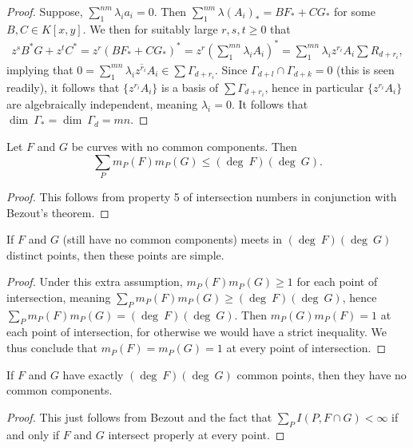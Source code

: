 \begin{proof}
        Suppose, $\sum_1^{nm} \lambda_i a_i = 0$. Then $\sum_1^{nm} \lambda (A_i)_\ast = BF_\ast+CG_\ast$ for some $B,C\in K[x,y]$. We then for suitably large $r,s,t\geq0$ that
        \begin{align*}
            z^sB^\ast G + z^tC^\ast = z^r(BF_\ast + CG_\ast)^\ast =z^r\left(\sum_1^{mn} \lambda_iA_i\right)^\ast = \sum_1^{mn}\lambda_iz^{r_i}A_i\sum R_{d+r_i},
        \end{align*}
        implying that $0=\sum_1^{mn} \overline{\lambda_iz^{r_i}A_i}\in \sum \Gamma_{d+r_i}.$ Since $\Gamma_{d+l} \cap \Gamma_{d+k} =0$ (this is seen readily), it follows that $\{z^{r_i}A_i\}$ is a basis of $\sum \Gamma_{d+r_i}$, hence in particular $\{z^{r_i}A_i\}$ are algebraically independent, meaning $\lambda_i=0$. It follows that $\dim\ \Gamma_\ast = \dim \ \Gamma_d = mn.$
    \end{proof}
    \begin{corollary}\label{SumOfMultiplicityBound}
        Let $F$ and $G$ be curves with no common components. Then 
        $$\sum_P m_P(F)m_P(G)\leq (\deg \ F)(\deg \ G).$$
    \end{corollary}
    \begin{proof}
        This follows from property 5 of intersection numbers in conjunction with Bezout's theorem. 
    \end{proof}
    \begin{corollary}
        If $F$ and $G$ (still have no common components) meets in $(\deg\ F)(\deg \ G)$ distinct points, then these points are simple. 
    \end{corollary}
    \begin{proof}
        Under this extra assumption, $m_P(F)m_P(G)\geq 1$ for each point of intersection, meaning $\sum_P m_P(F)m_P(G)\geq (\deg \ F)(\deg \ G)$, hence $\sum_P m_P(F)m_P(G) = (\deg \ F)(\deg \ G)$. Then $m_P(G)m_P(F)=1$ at each point of intersection, for otherwise we would have a strict inequality. We thus conclude that $m_P(F)=m_P(G)=1$ at every point of intersection. 
    \end{proof}
    \begin{corollary}
        If $F$ and $G$ have exactly $(\deg \ F)(\deg \ G)$ common points, then they have no common components.
     \end{corollary}
     \begin{proof}
         This just follows from Bezout and the fact that $\sum_P I(P,F\cap G)<\infty$ if and only if $F$ and $G$ intersect properly at every point. 
     \end{proof}
